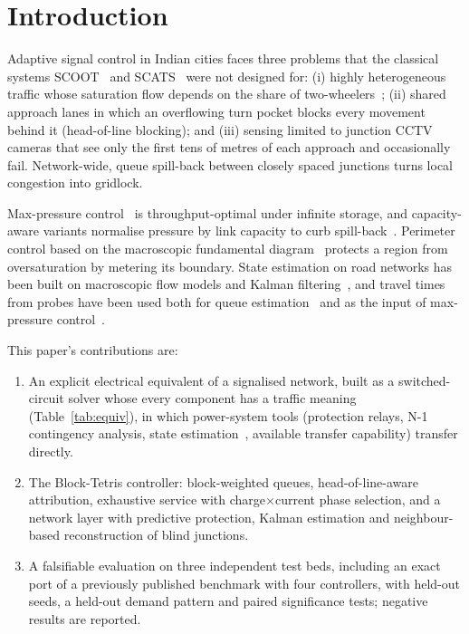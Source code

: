 \documentclass[journal]{IEEEtran}
\begin{document}
\section{Introduction}
Adaptive signal control in Indian cities faces three problems that the classical
systems SCOOT~\cite{hunt1982scoot} and SCATS~\cite{sims1980scats} were not designed
for: (i) highly heterogeneous traffic whose saturation flow depends on the share of
two-wheelers~\cite{indohcm2017}; (ii) shared approach lanes in which an overflowing
turn pocket blocks every movement behind it (head-of-line blocking); and (iii)
sensing limited to junction CCTV cameras that see only the first tens of metres of
each approach and occasionally fail. Network-wide, queue spill-back between closely
spaced junctions turns local congestion into gridlock.

Max-pressure control~\cite{varaiya2013maxpressure,kouvelas2014maxpressure} is
throughput-optimal under infinite storage, and capacity-aware variants normalise
pressure by link capacity to curb spill-back~\cite{gregoire2015capacity}. Perimeter
control based on the macroscopic fundamental
diagram~\cite{geroliminis2008yokohama,daganzo2008analytical} protects a region from
oversaturation by metering its boundary. State estimation on road networks has been
built on macroscopic flow models and Kalman filtering~\cite{wang2005ekf,kalman1960},
and travel times from probes have been used both for queue
estimation~\cite{ban2011queue} and as the input of max-pressure
control~\cite{mercader2020traveltime}.

This paper's contributions are:
\begin{enumerate}
\item An explicit electrical equivalent of a signalised network, built as a
switched-circuit solver whose every component has a traffic meaning
(Table~\ref{tab:equiv}), in which power-system tools (protection relays, N-1
contingency analysis, state estimation~\cite{abur2004se}, available transfer
capability) transfer directly.
\item The Block-Tetris controller: block-weighted queues, head-of-line-aware
attribution, exhaustive service with charge$\times$current phase selection, and a
network layer with predictive protection, Kalman estimation and neighbour-based
reconstruction of blind junctions.
\item A falsifiable evaluation on three independent test beds, including an exact
port of a previously published benchmark with four controllers, with held-out seeds,
a held-out demand pattern and paired significance tests; negative results are reported.
\end{enumerate}
\end{document}
